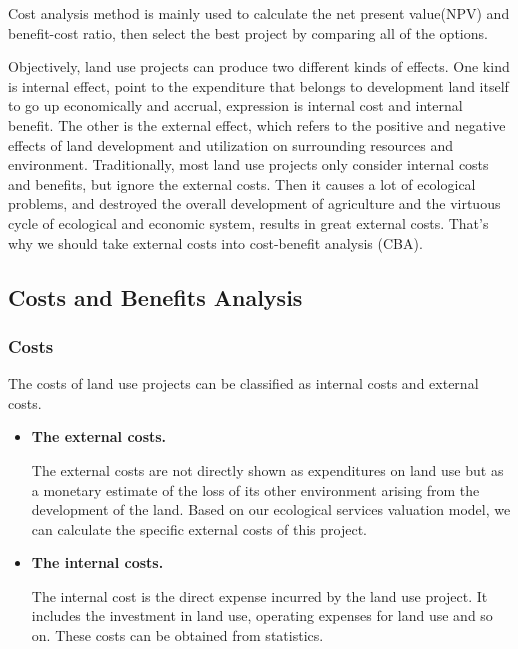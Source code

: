 \documentclass{mcmthesis}
\begin{document}
		Cost analysis method is mainly used to calculate the net present value(NPV) and benefit-cost ratio, then select the best project by comparing all of the options. 
		
		Objectively, land use projects can produce two different kinds of effects. One kind is internal effect, point to the expenditure that belongs to development land itself to go up economically and accrual, expression is internal cost and internal benefit. The other is the external effect, which refers to the positive and negative effects of land development and utilization on surrounding resources and environment. Traditionally, most land use projects only consider internal costs and benefits, but ignore the external costs. Then it causes a lot of ecological problems, and destroyed the overall development of agriculture and the virtuous cycle of ecological and economic system, results in great external costs. That’s why we should take external costs into cost-benefit analysis (CBA).
		
		\subsection{Costs and Benefits Analysis}
		
			\subsubsection{Costs}
			
				The costs of land use projects can be classified as internal costs and external costs.
				
				\begin{itemize}
					
					\item \textbf{The external costs.}
					
					The external costs are not directly shown as expenditures on land use but as a monetary estimate of the loss of its other environment arising from the development of the land. Based on our ecological services valuation model, we can calculate the specific external costs of this project.
					
					\item \textbf{The internal costs.}
					
					The internal cost is the direct expense incurred by the land use project. It includes the investment in land use, operating expenses for land use and so on. These costs can be obtained from statistics.
					
				\end{itemize}
					
\end{document}
